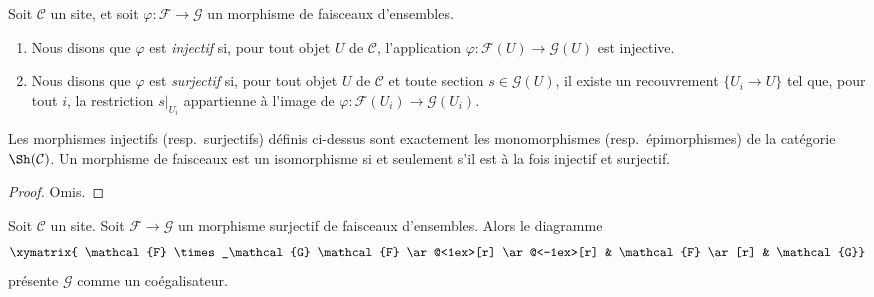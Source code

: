 \begin{definition}
\label{definition-sheaves-injective-surjective}
Soit $\mathcal{C}$ un site, et soit $\varphi : \mathcal{F}
\to \mathcal{G}$ un morphisme de faisceaux d’ensembles.
\begin{enumerate}
\item Nous disons que $\varphi$ est {\it injectif} si, pour tout objet
$U$ de $\mathcal{C}$, l’application $\varphi : \mathcal{F}(U)
\to \mathcal{G}(U)$ est injective.
\item Nous disons que $\varphi$ est {\it surjectif} si, pour tout objet
$U$ de $\mathcal{C}$ et toute section $s\in \mathcal{G}(U)$,
il existe un recouvrement $\{U_i \to U\}$ tel que, pour tout
$i$, la restriction $s|_{U_i}$ appartienne à l’image de
$\varphi : \mathcal{F}(U_i) \to \mathcal{G}(U_i)$.
\end{enumerate}
\end{definition}

\begin{lemma}
\label{lemma-mono-epi-sheaves}
Les morphismes injectifs (resp.\ surjectifs) définis ci-dessus
sont exactement les monomorphismes (resp.\ épimorphismes) de
la catégorie $\Sh(\mathcal{C})$. Un morphisme de faisceaux
est un isomorphisme si et seulement s’il est à la fois injectif
et surjectif.
\end{lemma}

\begin{proof}
Omis.
\end{proof}

\begin{lemma}
\label{lemma-coequalizer-surjection}
Soit $\mathcal{C}$ un site. Soit $\mathcal{F} \to \mathcal{G}$
un morphisme surjectif de faisceaux d’ensembles. Alors le diagramme
$$
\xymatrix{
\mathcal{F} \times_\mathcal{G} \mathcal{F}
\ar@<1ex>[r] \ar@<-1ex>[r]
&
\mathcal{F} \ar[r]
&
\mathcal{G}}
$$
présente $\mathcal{G}$ comme un coégalisateur.
\end{lemma}


